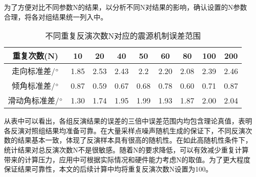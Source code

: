 为了方便对比不同参数N的结果，以分析不同N对结果的影响，确认设置的N参数合理，将各对组结果统一列入中。
\begin{table}[ht]
\centering
\caption{不同重复反演次数N对应的震源机制误差范围}
\label{tab3_07}
    \begin{tabular}{c c c c c c c c c}
    \hline
    重复次数(N)				&10  & 20	& 40 &50	& 60	& 80	& 100  & 200\\
    \hline
	走向标准差/$^\circ$	&1.85& 2.53	& 2.43&2.2  & 2.20  & 2.08  & 2.39 & 2.46\\
	倾角标准差/$^\circ$	&0.87& 0.59  & 0.67&0.68  & 0.78  & 0.60  & 0.71 & 0.87\\
	滑动角标准差/$^\circ$	&1.30& 1.74  & 1.95&1.99  & 1.93  & 1.87  & 2.00 & 2.04\\
    \hline
    \end{tabular}
\end{table}


从表中可以看出，各组反演结果的误差的三倍中误差范围内均包含理论真值，表明各反演对照组结果均准备可靠。在大量采样点噪声随机生成的保证下，不同反演次数的结果基本一致，体现了反演样本具有很高的随机性。在如此高随机性条件下，统计结果对总反演次数N不是很敏感。随着N的要求降低，可以有效减少重复计算带来的计算压力，应用中可根据实际情况和硬件能力考虑N的取值。为了更大程度保证结果可靠性，本文的后续计算中均将重复反演次数N设置为100。
